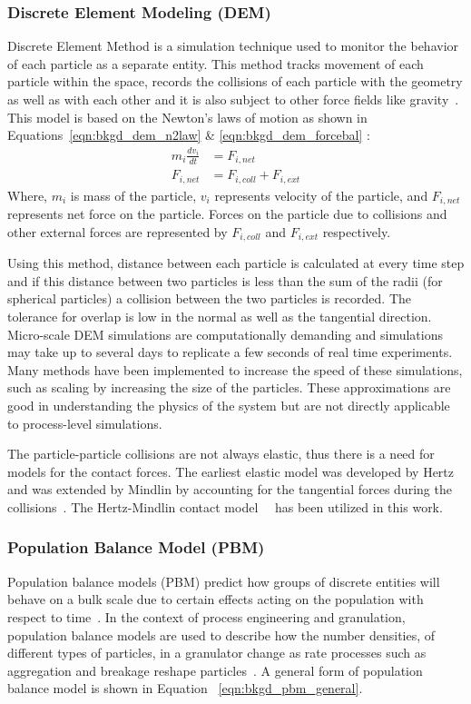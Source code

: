 \documentclass[preprint,11pt,authoryear]{elsarticle}
\begin{document}
\subsubsection{Discrete Element Modeling (DEM)}
Discrete Element Method is a simulation technique used to monitor the
behavior of each particle as a separate entity. This method tracks 
movement of each particle within the space, records the collisions 
of each particle with the geometry as well as with each other and it 
is also subject to other force fields like  gravity~\citep{Barrasso2015cerd}. 
This model is based on the Newton's laws of motion as shown in Equations~\ref{eqn:bkgd_dem_n2law} \&
\ref{eqn:bkgd_dem_forcebal} : \\
\begin{align}
m_i\frac{dv_i}{dt} &= F_{i,net} \label{eqn:bkgd_dem_n2law} \\
F_{i,net} &=  F_{i,coll} +  F_{i,ext} \label{eqn:bkgd_dem_forcebal}
\end{align}
Where, $m_i$ is mass of the particle, $v_i$ represents velocity of the
particle, and $F_{i,net}$ represents net force on the particle. Forces on the
particle due to collisions and other external forces are represented by
$F_{i,coll}$ and $F_{i,ext}$ respectively.

Using this method, distance between each particle is calculated at every
time step and if this distance between two particles is less than the sum of
the radii (for spherical particles)  a collision between the two particles is
recorded. The tolerance for overlap is low in the normal as well as the
tangential direction. Micro-scale DEM simulations are computationally
demanding and simulations may take up to several days to replicate a few
seconds of real time experiments. Many methods have been implemented to
increase the speed of these simulations, such as scaling by increasing the
size of the particles. These approximations are good in understanding the
physics of the system but are not directly applicable to process-level
simulations.

The particle-particle collisions are not always elastic, thus there is a need
for models for the contact forces. The earliest elastic model was developed by
Hertz and was extended by Mindlin by accounting for the  tangential forces
during the collisions~\citep{adams2000}. The Hertz-Mindlin contact
model~\citep{gantt2006}~\citep{hassanpour2013} has been utilized in this work.
 

\subsubsection{Population Balance Model (PBM)}
Population balance models (PBM) predict how groups of discrete entities will 
behave on a bulk scale due to certain effects acting on the population with 
respect to time~\citep{ramkrishna2014}. In the context of process engineering 
and granulation, population balance models are used to describe how the number 
densities, of different types of particles, in a granulator change as rate 
processes such as aggregation and breakage reshape particles~\citep{Barrasso2013}. A 
general form of population balance model is shown in Equation
~\ref{eqn:bkgd_pbm_general}.
  
\end{document}

